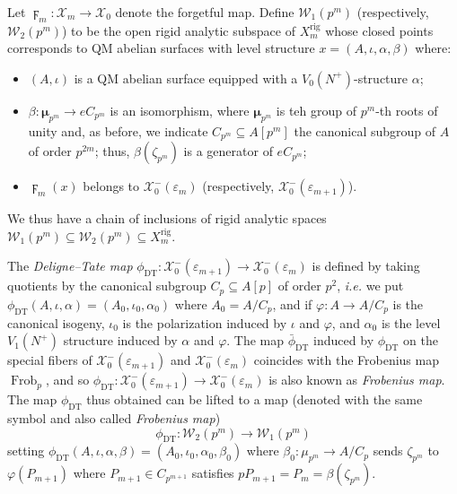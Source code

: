 \documentclass[a4paper,11pt]{amsart}
\numberwithin{equation}{section}
\theoremstyle{plain}
\theoremstyle{definition}
\theoremstyle{remark}
\DeclareMathOperator{\Frob}{Frob}
\newcommand{\rig}{\mathrm{rig}}
\begin{document}
Let $\digamma_m\colon {\mathcal{X}}_m\rightarrow\mathcal{X}_0$ denote the forgetful map. Define 
$\mathcal{W}_1(p^m)$ (respectively, $\mathcal{W}_2(p^m)$) to be the open rigid analytic subspace of  
${{X}}_m^\rig$ whose closed points corresponds to QM abelian surfaces with level structure 
$x=(A,\iota,\alpha,\beta) $ where:
\begin{itemize}
\item $(A,\iota)$ is a QM abelian surface equipped with a $V_0(N^+)$-structure $\alpha$; 
\item $\beta\colon\boldsymbol{\mu}_{p^m}\rightarrow eC_{p^m}$ is an isomorphism, where $\boldsymbol{\mu}_{p^m}$ is teh group of $p^m$-th roots of unity and, as before, we indicate $C_{p^m}\subseteq A[p^m]$ the 
canonical subgroup of $A$ of order $p^{2m}$; thus, $\beta(\zeta_{p^m})$ is a generator of $eC_{p^m}$; 
\item $\digamma_m(x)$ belongs to $\mathcal{X}_0^-(\varepsilon_m)$  
(respectively, $\mathcal{X}_0^-(\varepsilon_{m+1})$).
\end{itemize} 
We thus have a chain of inclusions of rigid analytic spaces 
$\mathcal{W}_1(p^m)\subseteq\mathcal{W}_2(p^m)\subseteq X_m^\rig.$ 

The \emph{Deligne--Tate map} $\phi_{\mathrm{DT}}\colon\mathcal{X}_0^-(\varepsilon_{m+1}) \rightarrow \mathcal{X}^-_0(\varepsilon_{m})$    is defined by taking quotients by the canonical subgroup $C_p\subseteq A[p]$ of order $p^2$, \emph{i.e.} we put $\phi_{\mathrm{DT}}(A,\iota,\alpha)=(A_0,\iota_0,\alpha_0)$ where $A_0=A/C_p$, and if 
$\varphi\colon A\rightarrow A/C_p$ is the canonical isogeny, 
$\iota_0$ is the polarization induced by $\iota$ and $\varphi$, 
and $\alpha_0$ 
is the level $V_1(N^+)$ structure induced by $\alpha$ and $\varphi$. The map $\bar\phi_{\mathrm{DT}}$ induced by 
$\phi_{\mathrm{DT}}$ on the special fibers of 
$\mathcal{X}_0^-(\varepsilon_{m+1})$ and $\mathcal{X}_0^-(\varepsilon_{m})$ coincides with the Frobenius map $\Frob_p$, and so $\phi_{\mathrm{DT}}\colon\mathcal{X}_0^-(\varepsilon_{m+1}) \rightarrow \mathcal{X}^-_0(\varepsilon_{m})$ is also known as \emph{Frobenius map}. The map $\phi_{\mathrm{DT}}$ thus obtained can be lifted to a map (denoted with the same symbol and also called \emph{Frobenius map})  
\begin{equation}\label{DTFrob}
\phi_{\mathrm{DT}}\colon\mathcal{W}_2(p^m)\longrightarrow \mathcal{W}_1(p^m)\end{equation}
setting 
$\phi_{\mathrm{DT}}(A,\iota,\alpha,\beta)=(A_0,\iota_0,\alpha_0,\beta_0)$ where $\beta_0\colon\mu_{p^m}\rightarrow A/C_p$ sends $\zeta_{p^m}$ to $\varphi(P_{m+1})$ where $P_{m+1}\in C_{p^{m+1}}$ satisfies $pP_{m+1}=P_m=\beta(\zeta_{p^m})$. 
\end{document}
